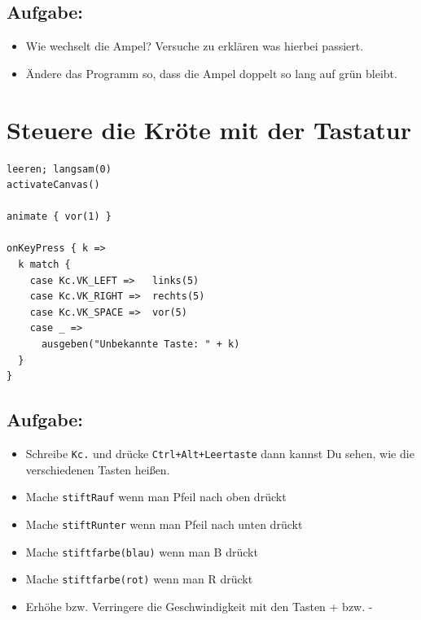 \section*{\color{BrickRed}Aufgabe:}


\begin{itemize}

\item {Wie wechselt die Ampel? Versuche zu erklären was hierbei passiert.}
\item {Ändere das Programm so, dass die Ampel doppelt so lang auf grün bleibt.}

\end{itemize}


\chapter{Steuere die Kröte mit der Tastatur}
\begin{multicols}{2}

\begin{lstlisting}[basicstyle={\ttfamily\fontsize{18}{22}\selectfont},numbers=none]
leeren; langsam(0)
activateCanvas()

animate { vor(1) }

onKeyPress { k =>
  k match {
    case Kc.VK_LEFT =>   links(5)
    case Kc.VK_RIGHT =>  rechts(5)
    case Kc.VK_SPACE =>  vor(5)
    case _ => 
      ausgeben("Unbekannte Taste: " + k)
  }
}
\end{lstlisting}
        


\columnbreak


\section*{\color{BrickRed}Aufgabe:}


\begin{itemize}

\item {Schreibe \lstinline{Kc.} und drücke \lstinline{Ctrl+Alt+Leertaste} dann kannst Du sehen, wie die verschiedenen Tasten heißen.}
\item {Mache \lstinline{stiftRauf} wenn man Pfeil nach oben drückt}
\item {Mache \lstinline{stiftRunter} wenn man Pfeil nach unten drückt}
\item {Mache \lstinline{stiftfarbe(blau)} wenn man B drückt}
\item {Mache \lstinline{stiftfarbe(rot)} wenn man R drückt}
\item {Erhöhe bzw. Verringere die Geschwindigkeit mit den Tasten + bzw. -}

\end{itemize}


\end{multicols}

